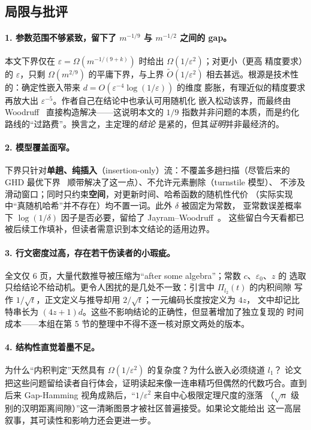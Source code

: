 \documentclass[UTF8, 11pt, a4paper, linestretch=1.15]{ctexart}
\theoremstyle{zhstyle}
\newcommand{\eps}{\varepsilon}
\begin{document}
	\subsection{局限与批评}
	
	\paragraph{1. 参数范围不够紧致，留下了 $m^{-1/9}$ 与 $m^{-1/2}$ 之间的 gap。}
	本文下界仅在 $\eps = \Omega(m^{-1/(9+k)})$ 时给出 $\Omega(1/\eps^2)$；对更小（更高
	精度要求）的 $\eps$，只剩 $\Omega(m^{2/9})$ 的平庸下界，与上界 $\tilde{O}(1/\eps^2)$
	相去甚远。根源是技术性的：确定性嵌入带来 $d = O(\eps^{-4}\log(1/\eps))$ 的维度
	膨胀，有理近似的精度要求再放大出 $\eps^{-5}$。作者自己在结论中也承认可用随机化
	嵌入松动该界，而最终由 Woodruff~\cite{Woo04} 直接构造解决——这说明本文的
	$1/9$ 指数并非问题的本质，而是约化路线的“过路费”。换言之，主定理的\emph{结论}
	是紧的，但其\emph{证明}并非最经济的。
	
	\paragraph{2. 模型覆盖面窄。}
	下界只针对\textbf{单趟、纯插入}（insertion-only）流：不覆盖多趟扫描（尽管后来的
	GHD 最优下界~\cite{CR11} 顺带解决了这一点）、不允许元素删除（turnstile 模型）、
	不涉及滑动窗口；同时只约束\textbf{空间}，对更新时间、哈希函数的随机性代价
	（实际实现中“真随机哈希”并不存在）均不置一词。此外 $\delta$ 被固定为常数，
	亚常数误差概率下 $\log(1/\delta)$ 因子是否必要，留给了 Jayram--Woodruff~\cite{JW13}。
	这些留白今天看都已被后续工作填补，但读者需意识到本文结论的适用边界。
	
	\paragraph{3. 行文密度过高，存在若干伤读者的小瑕疵。}
	全文仅 6 页，大量代数推导被压缩为“after some algebra”；常数 $c$、$\eps_0$、$z$ 的
	选取只给结论不给动机。更令人困扰的是几处不一致：引言中 $\Pi_{l_2}(t)$ 的内积间隙
	写作 $1/\sqrt{t}$，正文定义与推导却用 $2/\sqrt{t}$；一元编码长度按定义为 $4z$，
	文中却记比特串长为 $(4z+1)d$。这些不影响结论的正确性，但显著增加了独立复现的
	时间成本——本组在第 5 节的整理中不得不逐一核对原文两处的版本。
	
	\paragraph{4. 结构性直觉着墨不足。}
	为什么“内积判定”天然具有 $\Omega(1/\eps^2)$ 的复杂度？为什么嵌入必须绕道 $l_1$？
	论文把这些问题留给读者自行体会，证明读起来像一连串精巧但偶然的代数巧合。直到
	后来 Gap-Hamming 视角成熟后，“$1/\eps^2$ 来自中心极限定理尺度的涨落
	（$\sqrt{n}$ 级别的汉明距离间隙）”这一清晰图景才被社区普遍接受。如果论文能给出
	这一高层叙事，其可读性和影响力还会更进一步。
	
\end{document}
